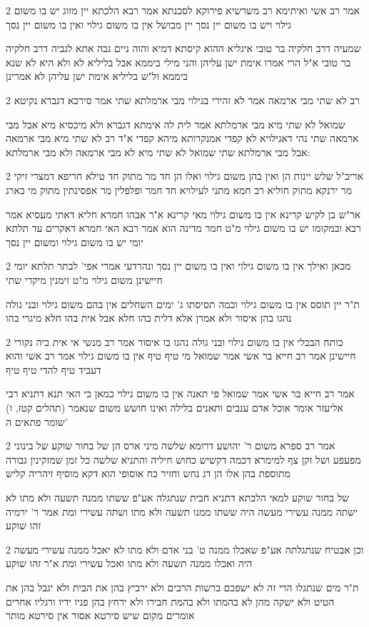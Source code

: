 \documentclass[12pt, openany]{book}
\newcommand{\sethebfont}{
\fontsize{10.5pt}{21.0pt} \selectfont
}
\newcommand{\twocol}[1]{
	{\sethebfont \begin{multicols}{2}
			#1
	\end{multicols}}	
}
\begin{document}
\twocol{אמר רב אשי ואיתימא רב משרשיא פירוקא לסכנתא אמר רבא הלכתא יין מזוג יש בו משום גילוי ויש בו משום יין נסך יין מבושל אין בו משום גילוי ואין בו משום יין נסך
\par שמעיה דרב חלקיה בר טובי איגליא ההוא קיסתא דמיא והוה ניים גבה אתא לגביה דרב חלקיה בר טובי א"ל הרי אמרו אימת ישן עליהן והני מילי ביממא אבל בליליא לא ולא היא לא שנא ביממא ול"ש בליליא אימת ישן עליהן לא אמרינן}
\twocol{רב לא שתי מבי ארמאה אמר לא זהירי בגילוי מבי ארמלתא שתי אמר סירכא דגברא נקיטא
\par שמואל לא שתי מיא מבי ארמלתא אמר לית לה אימתא דגברא ולא מיכסיא מיא אבל מבי ארמאה שתי נהי דאגילויא לא קפדי אמנקרותא מיהא קפדי א"ד רב לא שתי מיא מבי ארמאה אבל מבי ארמלתא שתי שמואל לא שתי מיא לא מבי ארמאה ולא מבי ארמלתא:}
\twocol{אריב"ל שלש יינות הן ואין בהן משום גילוי ואלו הן חד מר מתוק חד טילא חריפא דמצרי זיקי מר ירנקא מתוק חוליא רב חמא מתני לעילויא חד חמר ופלפלין מר אפסינתין מתוק מי בארג
\par אר"ש בן לקיש קרינא אין בו משום גילוי מאי קרינא א"ר אבהו חמרא חליא דאתי מעסיא אמר רבא ובמקומו יש בו משום גילוי מ"ט חמר מדינה הוא אמר רבא האי חמרא דאקרים עד תלתא יומי יש בו משום גילוי ומשום יין נסך}
\twocol{מכאן ואילך אין בו משום גילוי ואין בו משום יין נסך ונהרדעי אמרי אפי' לבתר תלתא יומי חיישינן משום גילוי מ"ט זימנין מיקרי שתי
\par ת"ר יין תוסס אין בו משום גילוי וכמה תסיסתו ג' ימים השחלים אין בהם משום גילוי ובני גולה נהגו בהן איסור ולא אמרן אלא דלית בהו חלא אבל אית בהו חלא מיגרי בהו}
\twocol{כותח הבבלי אין בו משום גילוי ובני גולה נהגו בו איסור אמר רב מנשי אי אית ביה נקורי חיישינן אמר רב חייא בר אשי אמר שמואל מי טיף טיף אין בו משום גילוי אמר רב אשי והוא דעביד טיף להדי טיף טיף
\par אמר רב חייא בר אשי אמר שמואל פי תאנה אין בו משום גילוי כמאן כי האי תנא דתניא רבי אליעזר אומר אוכל אדם ענבים ותאנים בלילה ואינו חושש משום שנאמר (תהלים קטז, ו) שומר פתאים ה'}
\twocol{אמר רב ספרא משום ר' יהושע דרומא שלשה מיני ארס הן של בחור שוקע של בינוני מפעפע ושל זקן צף למימרא דכמה דקשיש כחוש חיליה והתניא שלשה כל זמן שמזקינין גבורה מתוספת בהן אלו הן דג נחש וחזיר כח אוסופי הוא דקא מוסיף זיהריה קליש
\par של בחור שוקע למאי הלכתא דתניא חבית שנתגלה אע"פ ששתו ממנה תשעה ולא מתו לא ישתה ממנה עשירי מעשה היה ששתו ממנו תשעה ולא מתו ושתה עשירי ומת אמר ר' ירמיה זהו שוקע}
\twocol{וכן אבטיח שנתגלתה אע"פ שאכלו ממנה ט' בני אדם ולא מתו לא יאכל ממנה עשירי מעשה היה ואכלו ממנה תשעה ולא מתו ואכל עשירי ומת א"ר זהו שוקע
\par ת"ר מים שנתגלו הרי זה לא ישפכם ברשות הרבים ולא ירביץ בהן את הבית ולא יגבל בהן את הטיט ולא ישקה מהן לא בהמתו ולא בהמת חבירו ולא ירחץ בהן פניו ידיו ורגליו אחרים אומרים מקום שיש סירטא אסור אין סירטא מותר}
\end{document}
